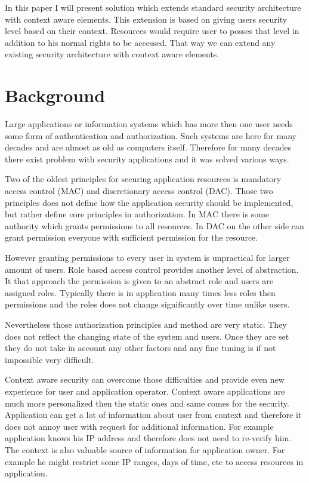 \documentclass{poster15}
\begin{document}
In this paper I will present solution which extends standard security architecture with context aware elements. This extension is based on giving users security level based on their context. Resources would require user to posses that level in addition to his normal rights to be accessed. That way we can extend any existing security architecture with context aware elements.

\section{Background}

Large applications or information systems which has more then one user needs some form of authentication and authorization. Such systems are here for many decades and are almost as old as computers itself. Therefore for many decades there exist problem with security applications and it was solved various ways.

Two of the oldest principles for securing application resources is mandatory access control (MAC) and discretionary access control (DAC). Those two principles does not define how the application security should be implemented, but rather define core principles in authorization. In MAC there is some authority which grants permissions to all resources. In DAC on the other side can grant permission everyone with sufficient permission for the resource.

However granting permissions to every user in system is unpractical for larger amount of users. Role based access control provides another level of abstraction. It that approach the permission is given to an abstract role and users are assigned roles. Typically there is in application many times less roles then permissions and the roles does not change significantly over time unlike users.

Nevertheless those authorization principles and method are very static. They does not reflect the changing state of the system and users. Once they are set they do not take in account any other factors and any fine tuning is if not impossible very difficult.

Context aware security can overcome those difficulties and provide even new experience for user and application operator. Context aware applications are much more personalized then the static ones and same comes for the security. Application can get a lot of information about user from context and therefore it does not annoy user with request for additional information. For example application knows his IP address and therefore does not need to re-verify him. The context is also valuable source of information for application owner. For example he might restrict some IP ranges, days of time, etc to access resources in application. 
\end{document}
